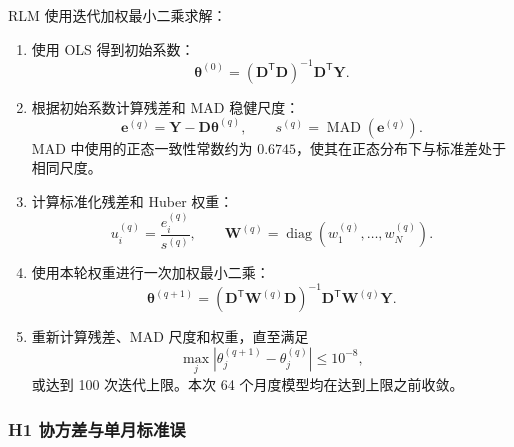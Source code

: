 \documentclass[UTF8,a4paper,11pt]{ctexart}
\begin{document}
RLM 使用迭代加权最小二乘求解：
\begin{enumerate}[leftmargin=2.7em]
  \item 使用 OLS 得到初始系数：
  \begin{equation}
    \bm{\theta}^{(0)}
    =(\bm{D}^{\mathsf T}\bm{D})^{-1}\bm{D}^{\mathsf T}\bm{Y}.
  \end{equation}

  \item 根据初始系数计算残差和 MAD 稳健尺度：
  \begin{equation}
    \bm{e}^{(q)}=\bm{Y}-\bm{D}\bm{\theta}^{(q)},
    \qquad
    s^{(q)}=\operatorname{MAD}(\bm{e}^{(q)}).
  \end{equation}
  MAD 中使用的正态一致性常数约为 $0.6745$，使其在正态分布下与标准差处于
  相同尺度。

  \item 计算标准化残差和 Huber 权重：
  \begin{equation}
    u_i^{(q)}=\frac{e_i^{(q)}}{s^{(q)}},
    \qquad
    \bm{W}^{(q)}=\operatorname{diag}
    \left(w_1^{(q)},\ldots,w_N^{(q)}\right).
  \end{equation}

  \item 使用本轮权重进行一次加权最小二乘：
  \begin{equation}
    \bm{\theta}^{(q+1)}
    =(\bm{D}^{\mathsf T}\bm{W}^{(q)}\bm{D})^{-1}
      \bm{D}^{\mathsf T}\bm{W}^{(q)}\bm{Y}.
  \end{equation}

  \item 重新计算残差、MAD 尺度和权重，直至满足
  \begin{equation}
    \max_j|\theta_j^{(q+1)}-\theta_j^{(q)}|\leq10^{-8},
  \end{equation}
  或达到 100 次迭代上限。本次 64 个月度模型均在达到上限之前收敛。
\end{enumerate}

\subsubsection{H1 协方差与单月标准误}
\end{document}
